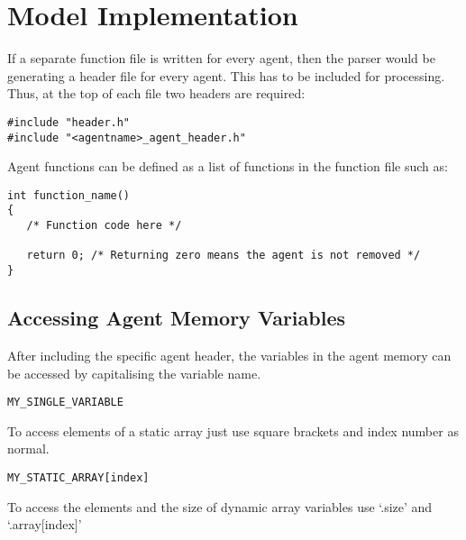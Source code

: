 \section{Model Implementation}\label{model_implementation}

If a separate function file is written for every agent, then the
parser would be generating a header file for every agent. This has
to be included for processing. Thus, at the top of each file two
headers are required:

\begin{mylisting}
\begin{verbatim}
#include "header.h"
#include "<agentname>_agent_header.h"
\end{verbatim}
\end{mylisting}

Agent functions can be defined as a list of functions in the
function file such as:

\begin{mylisting}
\begin{verbatim}
int function_name()
{
   /* Function code here */

   return 0; /* Returning zero means the agent is not removed */
}
\end{verbatim}
\end{mylisting}

\subsection{Accessing Agent Memory Variables}

After including the specific agent header, the variables in the
agent memory can be accessed by capitalising the variable name.

\begin{mylisting}
\begin{verbatim}
MY_SINGLE_VARIABLE
\end{verbatim}
\end{mylisting}

To access elements of a static array just use square brackets and index number as normal.

\begin{mylisting}
\begin{verbatim}
MY_STATIC_ARRAY[index]
\end{verbatim}
\end{mylisting}

To access the elements and the size of dynamic array variables use
`.size' and `.array[index]'

